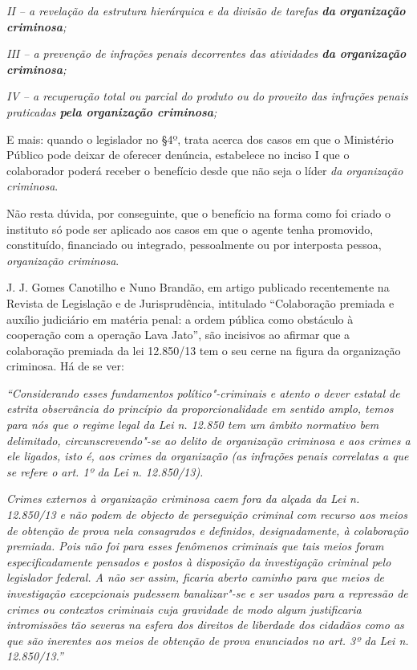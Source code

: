 \emph{II -- a revelação da estrutura hierárquica e da divisão de tarefas
\textbf{da} \textbf{organização criminosa};}

\emph{III -- a prevenção de infrações penais decorrentes das atividades
\textbf{da organização criminosa};}

\emph{IV -- a recuperação total ou parcial do produto ou do proveito das
infrações penais praticadas \textbf{pela organização criminosa};}

E mais: quando o legislador no §4º, trata acerca dos casos em que o
Ministério Público pode deixar de oferecer denúncia, estabelece no
inciso I que o colaborador poderá receber o benefício desde que não seja
o líder \emph{da organização criminosa}.

Não resta dúvida, por conseguinte, que o benefício na forma como foi
criado o instituto só pode ser aplicado aos casos em que o agente tenha
promovido, constituído, financiado ou integrado, pessoalmente ou por
interposta pessoa, \emph{organização criminosa}.

J. J. Gomes Canotilho e Nuno Brandão, em artigo publicado recentemente
na Revista de Legislação e de Jurisprudência, intitulado ``Colaboração
premiada e auxílio judiciário em matéria penal: a ordem pública como
obstáculo à cooperação com a operação Lava Jato'', são incisivos ao
afirmar que a colaboração premiada da lei 12.850/13 tem o seu cerne na
figura da organização criminosa. Há de se ver:

\emph{``Considerando esses fundamentos político"-criminais e atento o
dever estatal de estrita observância do princípio da proporcionalidade
em sentido amplo, temos para nós que o regime legal da Lei n. 12.850 tem
um âmbito normativo bem delimitado, circunscrevendo"-se ao delito de
organização criminosa e aos crimes a ele ligados, isto é, aos crimes da
organização (as infrações penais correlatas a que se refere o art. 1º da
Lei n. 12.850/13).}

\emph{Crimes externos à organização criminosa caem fora da alçada da Lei
n. 12.850/13 e não podem de objecto de perseguição criminal com recurso
aos meios de obtenção de prova nela consagrados e definidos,
designadamente, à colaboração premiada. Pois não foi para esses
fenômenos criminais que tais meios foram especificadamente pensados e
postos à disposição da investigação criminal pelo legislador federal. A
não ser assim, ficaria aberto caminho para que meios de investigação
excepcionais pudessem banalizar"-se e ser usados para a repressão de
crimes ou contextos criminais cuja gravidade de modo algum justificaria
intromissões tão severas na esfera dos direitos de liberdade dos
cidadãos como as que são inerentes aos meios de obtenção de prova
enunciados no art. 3º da Lei n. 12.850/13.''}

